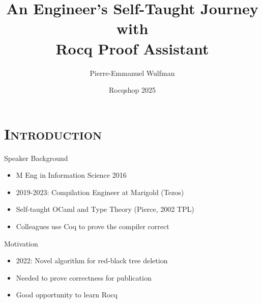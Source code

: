 \documentclass[xcolor=x11names]{beamer}
\title[Self-Taught Journey with Rocq]{An Engineer's Self-Taught Journey with \\ Rocq Proof Assistant}
\author{Pierre-Emmanuel Wulfman}
\institute{Graduate School of Mathematics, Nagoya University}
\date{Rocqshop 2025}
\renewcommand{\(}{\begin{columns}}
\renewcommand{\)}{\end{columns}}
\newcommand{\<}[1]{\begin{column}{#1}}
\renewcommand{\>}{\end{column}}
\begin{document}
\begin{frame}
   \titlepage
\end{frame}

\section{\scshape Introduction}
\begin{frame}{Speaker Background}
   \begin{itemize}
      \item M Eng in Information Science 2016
      \item 2019-2023: Compilation Engineer at Marigold (Tezos)
      \item Self-taught OCaml and Type Theory (Pierce, 2002 TPL)
      \item Colleagues use Coq to prove the compiler correct
   \end{itemize}
\end{frame}


\begin{frame}{Motivation}
   \begin{itemize}
      \item 2022: Novel algorithm for red-black tree deletion
      \item Needed to prove correctness for publication
      \item Good opportunity to learn Rocq
   \end{itemize}
\end{frame}
\end{document}
